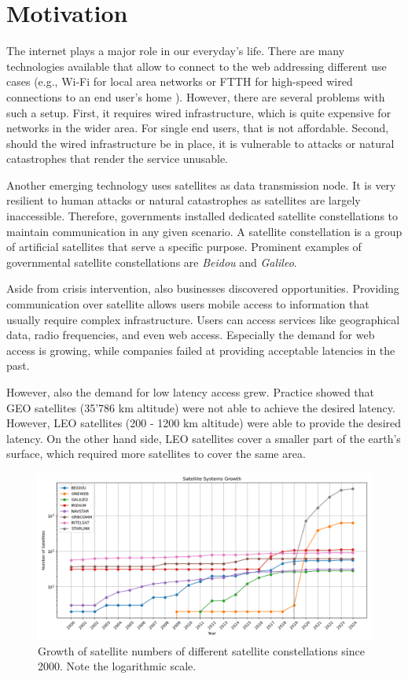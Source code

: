 \section{Motivation} \label{sec:motivation}

The internet plays a major role in our everyday's life. There are many technologies available that allow to connect to the web addressing different use cases (e.g., Wi-Fi for local area networks \cite{Henry2002} or \ac{FTTH} for high-speed wired connections to an end user's home \cite{Aleksic2010}).
However, there are several problems with such a setup. First, it requires wired infrastructure, which is quite expensive for networks in the wider area. For single end users, that is not affordable. Second, should the wired infrastructure be in place, it is vulnerable to attacks or natural catastrophes that render the service unusable.

Another emerging technology uses satellites as data transmission node. It is very resilient to human attacks or natural catastrophes as satellites are largely inaccessible. Therefore, governments installed dedicated satellite constellations to maintain communication in any given scenario. A satellite constellation is a group of artificial satellites that serve a specific purpose. Prominent examples of governmental satellite constellations are \textit{Beidou} and \textit{Galileo}.

Aside from crisis intervention, also businesses discovered opportunities. Providing communication over satellite allows users mobile access to information that usually require complex infrastructure. Users can access services like geographical data, radio frequencies, and even web access.
Especially the demand for web access is growing, while companies failed at providing acceptable latencies in the past.

However, also the demand for low latency access grew. Practice showed that \ac{GEO} satellites (35'786 km altitude) were not able to achieve the desired latency. However, \ac{LEO} satellites (200 - 1200 km altitude) were able to provide the desired latency. On the other hand side, \ac{LEO} satellites cover a smaller part of the earth's surface, which required more satellites to cover the same area.

\begin{figure}
	\label{fig:satellitegrowth}
	\centering
	\includegraphics[width=\textwidth]{./chapters/img/satellite-growth.png}
	\caption{Growth of satellite numbers of different satellite constellations since 2000. Note the logarithmic scale.}
\end{figure}

